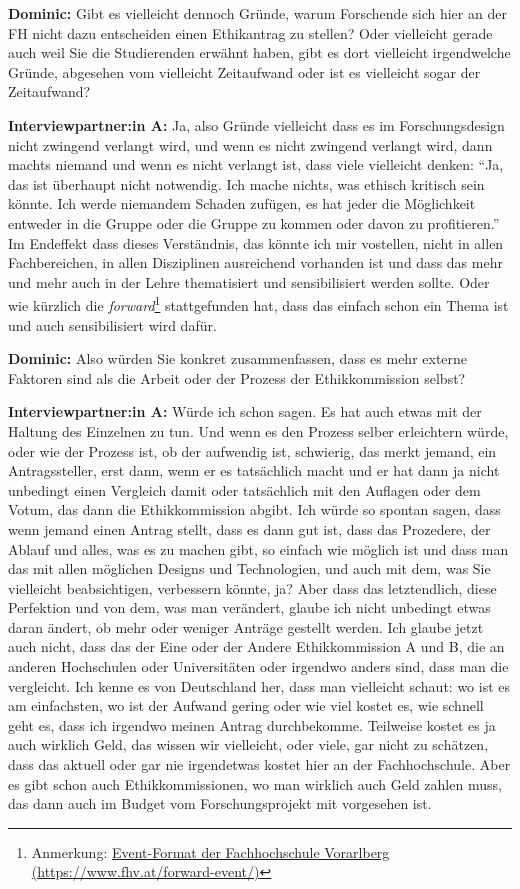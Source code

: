 \documentclass[a4paper,12pt,twoside]{scrreprt}
\begin{document}
\textbf{Dominic:} Gibt es vielleicht dennoch Gründe, warum Forschende sich hier an der FH nicht dazu entscheiden einen Ethikantrag zu stellen? Oder vielleicht gerade auch weil Sie die Studierenden erwähnt haben, gibt es dort vielleicht irgendwelche Gründe, abgesehen vom vielleicht Zeitaufwand oder ist es vielleicht sogar der Zeitaufwand?

\textbf{Interviewpartner:in A:} Ja, also Gründe vielleicht dass es im Forschungsdesign nicht zwingend verlangt wird, und wenn es nicht zwingend verlangt wird, dann machts niemand und wenn es nicht verlangt ist, dass viele vielleicht denken: \enquote{Ja, das ist überhaupt nicht notwendig. Ich mache nichts, was ethisch kritisch sein könnte. Ich werde niemandem Schaden zufügen, es hat jeder die Möglichkeit entweder in die Gruppe oder die Gruppe zu kommen oder davon zu profitieren.} Im Endeffekt dass dieses Verständnis, das könnte ich mir vostellen, nicht in allen Fachbereichen, in allen Disziplinen ausreichend vorhanden ist und dass das mehr und mehr auch in der Lehre thematisiert und sensibilisiert werden sollte. Oder wie kürzlich die \textit{forward}\footnote{Anmerkung: \href{https://www.fhv.at/forward-event/}{Event-Format der Fachhochschule Vorarlberg (\url{https://www.fhv.at/forward-event/})}} stattgefunden hat, dass das einfach schon ein Thema ist und auch sensibilisiert wird dafür.

\textbf{Dominic:} Also würden Sie konkret zusammenfassen, dass es mehr externe Faktoren sind als die Arbeit oder der Prozess der Ethikkommission selbst?

\textbf{Interviewpartner:in A:} Würde ich schon sagen. Es hat auch etwas mit der Haltung des Einzelnen zu tun. Und wenn es den Prozess selber erleichtern würde, oder wie der Prozess ist, ob der aufwendig ist, schwierig, das merkt jemand, ein Antragssteller, erst dann, wenn er es tatsächlich macht und er hat dann ja nicht unbedingt einen Vergleich damit oder tatsächlich mit den Auflagen oder dem Votum, das dann die Ethikkommission abgibt. Ich würde so spontan sagen, dass wenn jemand einen Antrag stellt, dass es dann gut ist, dass das Prozedere, der Ablauf und alles, was es zu machen gibt, so einfach wie möglich ist und dass man das mit allen möglichen Designs und Technologien, und auch mit dem, was Sie vielleicht beabsichtigen, verbessern könnte, ja? Aber dass das letztendlich, diese Perfektion und von dem, was man verändert, glaube ich nicht unbedingt etwas daran ändert, ob mehr oder weniger Anträge gestellt werden. Ich glaube jetzt auch nicht, dass das der Eine oder der Andere Ethikkommission A und B, die an anderen Hochschulen oder Universitäten oder irgendwo anders sind, dass man die vergleicht. Ich kenne es von Deutschland her, dass man vielleicht schaut: wo ist es am einfachsten, wo ist der Aufwand gering oder wie viel kostet es, wie schnell geht es, dass ich irgendwo meinen Antrag durchbekomme. Teilweise kostet es ja auch wirklich Geld, das wissen wir vielleicht, oder viele, gar nicht zu schätzen, dass das aktuell oder gar nie irgendetwas kostet hier an der Fachhochschule. Aber es gibt schon auch Ethikkommissionen, wo man wirklich auch Geld zahlen muss, das dann auch im Budget vom Forschungsprojekt mit vorgesehen ist.
\end{document}
